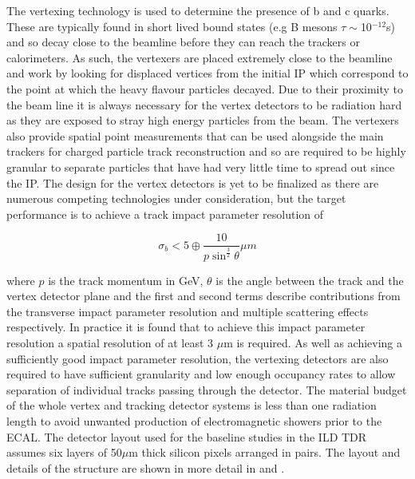 The vertexing technology is used to determine the presence of b and c quarks. These are typically found in short lived bound states (e.g B mesons $\tau\sim$10$^{-12}$s) and so decay close to the beamline before they can reach the trackers or calorimeters. As such, the vertexers are placed extremely close to the beamline and work by looking for displaced vertices from the initial \ac{IP} which correspond to the point at which the heavy flavour particles decayed. Due to their proximity to the beam line it is always necessary for the vertex detectors to be radiation hard as they are exposed to stray high energy particles from the beam. The vertexers also provide spatial point measurements that can be used alongside the main trackers for charged particle track reconstruction and so are required to be highly granular to separate particles that have had very little time to spread out since the \ac{IP}. The design for the vertex detectors is yet to be finalized as there are numerous competing technologies under consideration, but the target performance\cite{ILCTDR} is to achieve a track impact parameter resolution of

\begin{equation}
\sigma_{b} < 5 \oplus \frac{10}{p\sin^{\frac{3}{2}}\theta}\mu m
\end{equation}

where $p$ is the track momentum in GeV, $\theta$ is the angle between the track and the vertex detector plane and the first and second terms describe contributions from the transverse impact parameter resolution and multiple scattering effects respectively.  In practice it is found that to achieve this impact parameter resolution a spatial resolution of at least 3 $\mu$m is required. As well as achieving a sufficiently good impact parameter resolution, the vertexing detectors are also required to have sufficient granularity and low enough occupancy rates to allow separation of individual tracks passing through the detector. The material budget of the whole vertex and tracking detector systems is less than one radiation length to avoid unwanted production of electromagnetic showers prior to the \ac{ECAL}. The detector layout used for the baseline studies in the \ac{ILD} \ac{TDR} assumes six layers of 50$\mu$m thick silicon pixels arranged in pairs. The layout and details of the structure are shown in more detail in  and .

